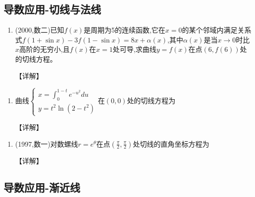 \documentclass[12pt, a4paper, oneside, UTF8]{ctexbook}
\begin{document}
\subsection{导数应用-切线与法线}

\begin{remark}
\end{remark}

\begin{enumerate}[label=\arabic*.,start=10]
    \item  (2000,数二)已知$f(x)$是周期为5的连续函数,它在$x=0$的某个邻域内满足关系式$f(1+\sin x)-3f(1-\sin x)=8x+\alpha(x)$,其中$\alpha(x)$是当$x\to0$时比$x$高阶的无穷小,且$f(x)$在$x=1$处可导,求曲线$y=f(x)$在点$(6,f(6))$处的切线方程。
    
    \begin{solution}
    【详解】
    \end{solution}
\end{enumerate}

\begin{remark}
\end{remark}

\begin{enumerate}[label=\arabic*.,start=11]
    \item  曲线$\begin{cases}
        x=\int_0^{1-t}e^{-u^2}du \\
        y=t^2\ln(2-t^2)
    \end{cases}$在$(0,0)$处的切线方程为\underline{\quad}
    
    \begin{solution}
    【详解】
    \end{solution}
\end{enumerate}

\begin{remark}
\end{remark}

\begin{enumerate}[label=\arabic*.,start=12]
    \item  (1997,数一)对数螺线$r=e^\theta$在点$(\frac{\pi}{2},\frac{\pi}{2})$处切线的直角坐标方程为\underline{\quad}
    
    \begin{solution}
    【详解】
    \end{solution}
\end{enumerate}

\subsection{导数应用-渐近线}
\end{document}

